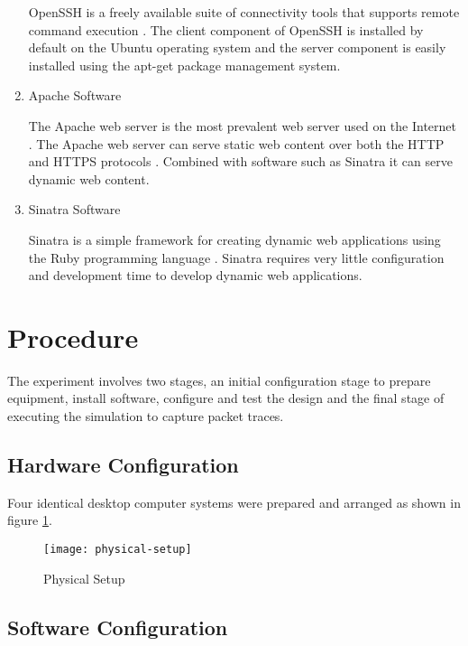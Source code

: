 \begin{enumerate}
  OpenSSH is a freely available suite of connectivity tools
  \parencite{:2010zr,:ve} that supports remote command execution
  \parencite{Tucker:2010ly, :2010zr}. The client component of OpenSSH is
  installed by default on the Ubuntu operating system and the server component
  is easily installed using the apt-get package management system.

  \item Apache Software

  The Apache web server is the most prevalent web server used on the Internet
  \parencite{2010:dq}. The Apache web server can serve static web content over
  both the HTTP and HTTPS protocols \parencite{Foundation:2011uq}. Combined with
  software such as Sinatra it can serve dynamic web content.

  \item Sinatra Software

  Sinatra is a simple framework for creating dynamic web applications using the
  Ruby programming language \parencite{:2010bh}. Sinatra requires very little
  configuration and development time to develop dynamic web applications.

\end{enumerate}

\section{Procedure}

The experiment involves two stages, an initial configuration stage to prepare
equipment, install software, configure and test the design and the final stage
of executing the simulation to capture packet traces.

\subsection{Hardware Configuration}

Four identical desktop computer systems were prepared and arranged as shown
in figure \ref{physical-setup}.

\begin{figure}[H]
  \centering\texttt{[image: physical-setup]}
  \caption{Physical Setup}
  \label{physical-setup}
\end{figure}

\subsection{Software Configuration}

